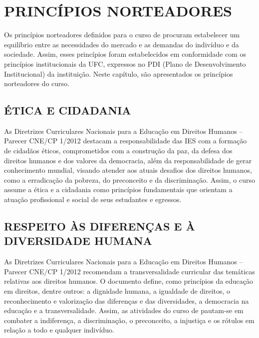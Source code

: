 \chapter{PRINCÍPIOS NORTEADORES}
\label{cap:principios-norteadores}

Os princípios norteadores definidos para o curso de \nomedocurso procuram estabelecer um equilíbrio entre as necessidades do mercado e as demandas do indivíduo e da  sociedade. Assim, esses princípios foram estabelecidos em conformidade com os princípios institucionais da UFC, expressos no PDI (Plano de Desenvolvimento Institucional) da instituição. Neste capítulo, são apresentados os princípios norteadores do curso.

\section{ÉTICA E CIDADANIA}

As Diretrizes Curriculares Nacionais para a Educação em Direitos Humanos – Parecer CNE/CP 1/2012 \cite{brasil2012dcnedh} destacam a responsabilidade das IES com a formação de cidadãos éticos, comprometidos com a construção da paz, da defesa dos direitos humanos e dos valores da democracia, além da responsabilidade de gerar conhecimento mundial, visando atender aos atuais desafios dos direitos humanos, como a erradicação da pobreza, do preconceito e da discriminação. Assim, o curso assume a ética e a cidadania como princípios fundamentais que orientam a atuação profissional e social de seus estudantes e egressos. %

\section{RESPEITO ÀS DIFERENÇAS E À DIVERSIDADE HUMANA}

As Diretrizes Curriculares Nacionais para a Educação em Direitos Humanos – Parecer CNE/CP 1/2012 \cite{brasil2012dcnedh} recomendam a transversalidade curricular das temáticas relativas aos direitos humanos. O documento define, como princípios da educação em direitos, dentre outros: a dignidade humana, a igualdade de direitos, o reconhecimento e valorização das diferenças e das diversidades, a democracia na educação e a transversalidade. Assim, as atividades do curso de \nomedocurso pautam-se em combater a indiferença, a discriminação, o preconceito, a injustiça e os rótulos em relação a todo e qualquer indivíduo.

